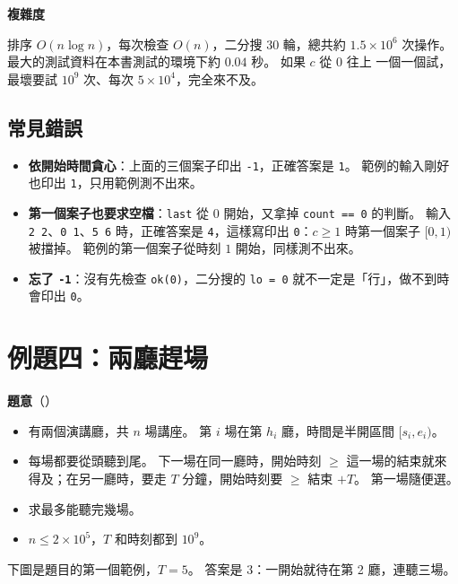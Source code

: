 \textbf{複雜度}

排序 $O(n \log n)$，每次檢查 $O(n)$，二分搜 $30$ 輪，總共約 $1.5 \times 10^6$
次操作。 最大的測試資料在本書測試的環境下約 $0.04$ 秒。 如果 $c$ 從 $0$ 往上
一個一個試，最壞要試 $10^9$ 次、每次 $5 \times 10^4$，完全來不及。

\subsection{常見錯誤}

\begin{itemize}
\item \textbf{依開始時間貪心}：上面的三個案子印出 \texttt{-1}，正確答案是
\texttt{1}。 範例的輸入剛好也印出 \texttt{1}，只用範例測不出來。
\item \textbf{第一個案子也要求空檔}：\texttt{last} 從 $0$ 開始，又拿掉
\texttt{count == 0} 的判斷。 輸入 \texttt{2 2}、\texttt{0 1}、\texttt{5 6}
時，正確答案是 \texttt{4}，這樣寫印出 \texttt{0}：$c \ge 1$ 時第一個案子
$[0, 1)$ 被擋掉。 範例的第一個案子從時刻 $1$ 開始，同樣測不出來。
\item \textbf{忘了 \texttt{-1}}：沒有先檢查 \texttt{ok(0)}，二分搜的
\texttt{lo = 0} 就不一定是「行」，做不到時會印出 \texttt{0}。
\end{itemize}

\section{例題四：兩廳趕場}
\label{sec:cap-halls}

\textbf{題意}（）

\begin{itemize}
\item 有兩個演講廳，共 $n$ 場講座。 第 $i$ 場在第 $h_i$ 廳，時間是半開區間
$[s_i, e_i)$。
\item 每場都要從頭聽到尾。 下一場在同一廳時，開始時刻 $\ge$ 這一場的結束就來
得及；在另一廳時，要走 $T$ 分鐘，開始時刻要 $\ge$ 結束 $+ T$。 第一場隨便選。
\item 求最多能聽完幾場。
\item $n \le 2 \times 10^5$，$T$ 和時刻都到 $10^9$。
\end{itemize}

下圖是題目的第一個範例，$T = 5$。 答案是 $3$：一開始就待在第 2 廳，連聽三場。

\begin{center}
\diagcaption{範例一的五場講座。 橘色是最佳的聽法；粉色的 $[0, 2)$ 結束得最早，
可是聽了它，最早 $7$ 才走得到第 2 廳，三場都趕不上。}
\label{fig:cap-halls}
\end{center}

